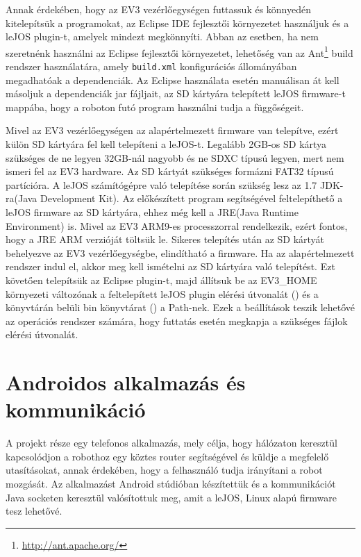 Annak érdekében, hogy az EV3 vezérlőegységen futtassuk és könnyedén kitelepítsük a programokat, az Eclipse IDE fejlesztői környezetet használjuk és a leJOS plugin-t, amelyek mindezt megkönnyíti. Abban az esetben, ha nem szeretnénk használni az Eclipse fejlesztői környezetet, lehetőség van az Ant\footnote{\href{http://ant.apache.org/}{http://ant.apache.org/}} build rendszer használatára, amely \texttt{build.xml} konfigurációs állományában megadhatóak a dependenciák. Az Eclipse használata esetén manuálisan át kell másoljuk a dependenciák jar fájljait, az SD kártyára telepített leJOS firmware-t  mappába, hogy a roboton futó program használni tudja a függőségeit.

Mivel az EV3 vezérlőegységen az alapértelmezett firmware van telepítve, ezért külön SD kártyára fel kell telepíteni a leJOS-t. Legalább 2GB-os SD kártya szükséges de ne legyen 32GB-nál nagyobb és ne SDXC típusú legyen, mert nem ismeri fel az EV3 hardware. Az SD kártyát szükséges formázni FAT32 típusú partícióra. A leJOS számítógépre való telepítése során szükség lesz az 1.7 JDK-ra(Java Development Kit). Az előkészített program segítségével feltelepíthető a leJOS firmware az SD kártyára, ehhez még kell a JRE(Java Runtime Environment) is. Mivel az EV3 ARM9-es processzorral rendelkezik, ezért fontos, hogy a JRE ARM verzióját töltsük le. Sikeres telepítés után az SD kártyát behelyezve az EV3 vezérlőegységbe, elindítható a firmware. Ha az alapértelmezett rendszer indul el, akkor meg kell ismételni az SD kártyára való telepítést. Ezt követően telepítsük az Eclipse plugin-t, majd állítsuk be az EV3\_HOME környezeti változónak a feltelepített leJOS plugin elérési útvonalát () és a könyvtárán belüli bin könyvtárat () a Path-nek. Ezek a beállítások teszik lehetővé az operációs rendszer számára, hogy futtatás esetén megkapja a szükséges fájlok elérési útvonalát.

\section{Androidos alkalmazás és kommunikáció}\label{sec:MEGVALOSITAS:android}
A projekt része egy telefonos alkalmazás, mely célja, hogy hálózaton keresztül kapcsolódjon a robothoz egy köztes router segítségével és küldje a megfelelő utasításokat, annak érdekében, hogy a felhasználó tudja irányítani a robot mozgását. Az alkalmazást Android stúdióban készítettük és a kommunikációt Java socketen keresztül valósítottuk meg, amit a leJOS, Linux alapú firmware tesz lehetővé.

